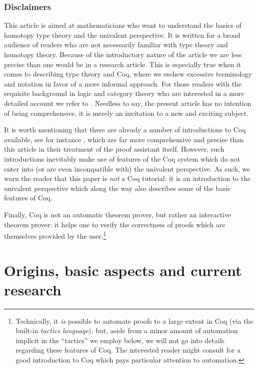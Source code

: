 \documentclass[11pt]{amsart}
\theoremstyle{definition}
\theoremstyle{remark}
\numberwithin{equation}{section}
\begin{document}
\subsubsection*{Disclaimers}

This article is aimed at mathematicians who want to understand the basics
of homotopy type theory and the univalent perspective. It is
written for a broad audience of readers who are not necessarily
familiar with type theory and homotopy theory. Because of the
introductory nature of the article we are less precise than one would
be in a research article.  This is especially true when it comes to
describing type theory and Coq, where we eschew excessive terminology
and notation in favor of a more informal approach.  For those readers
with the requisite background in logic and category theory who are
interested in a more detailed account we refer to \cite{Awodey:TTH}.  Needless
to say, the present article has no intention of being comprehensive,
it is merely an invitation to a new and exciting subject.

It is worth mentioning that there are already a number of introductions
to Coq available, see for instance \cite{Bertot:2004uj}, which are far
more comprehensive and precise than this article in their treatment of
the proof assistant itself.  However, such introductions inevitably
make use of features of the Coq system which do not enter into (or are
even incompatible with) the univalent perspective.  As such, we warn
the reader that this paper is \emph{not} a Coq tutorial: it is an
introduction to the univalent perspective which along the way
also describes some of the basic features of Coq.

Finally, Coq is not an automatic theorem prover, but rather an interactive
theorem prover: it helps one to verify the correctness of proofs which
are themselves provided by the user.\footnote{Technically, it \emph{is}
  possible to automate proofs to a large extent in Coq (via the built-in
\emph{tactics language}), but, aside
  from a minor amount of automation implicit in the ``tactics'' we
  employ below, we will not go into details regarding these features
  of Coq.  The interested reader might consult \cite{Chlipala:CP} for a good
  introduction to Coq which pays particular attention to automation.}

\section{Origins, basic aspects and current research} \label{sec:origins}
\end{document}
